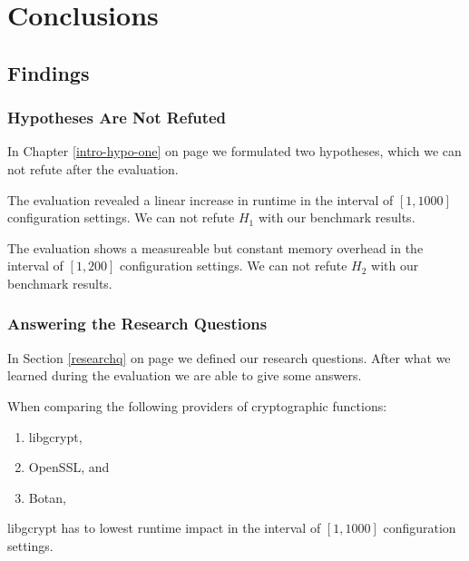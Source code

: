 \chapter{Conclusions}

\section{Findings}

	\subsection{Hypotheses Are Not Refuted}

In Chapter \ref{intro-hypo-one} on page \pageref{intro-hypo-one} we formulated two hypotheses, which we can not refute after the evaluation.


The evaluation revealed a linear increase in runtime in the interval of $[1,1000]$ configuration settings.
We can not refute $H_1$ with our benchmark results.


The evaluation shows a measureable but constant memory overhead in the interval of $[1,200]$ configuration settings.
We can not refute $H_2$ with our benchmark results.

	\subsection{Answering the Research Questions}

In Section \ref{researchq} on page \pageref{researchq} we defined our research questions.
After what we learned during the evaluation we are able to give some answers.


When comparing the following providers of cryptographic functions:
\begin{enumerate}
\item libgcrypt,
\item OpenSSL, and
\item Botan,
\end{enumerate}

libgcrypt has to lowest runtime impact in the interval of $[1,1000]$ configuration settings.




